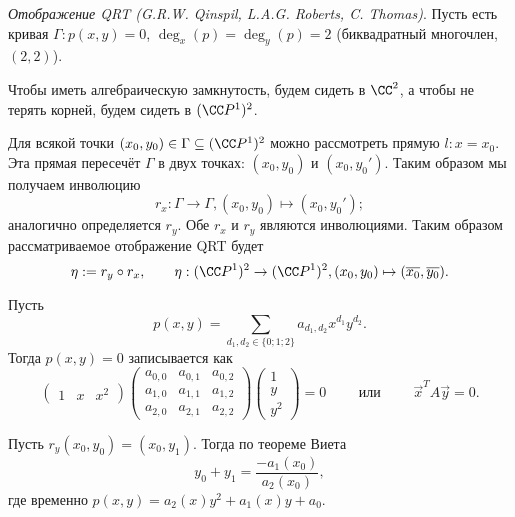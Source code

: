 \documentclass[12pt,a4paper]{article}
\begin{document}
    \begin{definition}
        \emph{Отображение QRT (G.R.W. Qinspil, L.A.G. Roberts, C. Thomas)}. Пусть есть кривая $\Gamma: p(x, y) = 0$, $\deg_x(p) = \deg_y(p) = 2$ (биквадратный многочлен, $(2, 2)$).

        Чтобы иметь алгебраическую замкнутость, будем сидеть в $\CC^2$, а чтобы не терять корней, будем сидеть в $(\CC P^1)^2$.

        Для всякой точки $(x_0, y_0) \in \Gamma \subseteq (\CC P^1)^2$ можно рассмотреть прямую $l: x = x_0$. Эта прямая пересечёт $\Gamma$ в двух точках: $(x_0, y_0)$ и $(x_0, y_0')$. Таким образом мы получаем инволюцию
        \[r_x: \Gamma \to \Gamma, (x_0, y_0) \mapsto (x_0, y_0');\]
        аналогично определяется $r_y$. Обе $r_x$ и $r_y$ являются инволюциями. Таким образом рассматриваемое отображение QRT будет
        \[\eta := r_y \circ r_x, \qquad \eta: (\CC P^1)^2 \to (\CC P^1)^2, (x_0, y_0) \mapsto (\overline{x_0}, \overline{y_0}).\]
    \end{definition}

    \begin{definition}
        Пусть
        \[p(x, y) = \sum_{d_1, d_2 \in \{0; 1; 2\}} a_{d_1, d_2} x^{d_1} y^{d_2}.\]
        Тогда $p(x, y) = 0$ записывается как
        \[
            \begin{pmatrix}
                1& x& x^2
            \end{pmatrix}
            \begin{pmatrix}
                a_{0,0}& a_{0, 1}& a_{0, 2}\\
                a_{1,0}& a_{1, 1}& a_{1, 2}\\
                a_{2,0}& a_{2, 1}& a_{2, 2}
            \end{pmatrix}
            \begin{pmatrix}
                1\\
                y\\
                y^2
            \end{pmatrix}
            = 0
            \qquad \text{ или } \qquad
            \vec{x}^T A \vec{y} = 0.
        \]
    \end{definition}
    
    \begin{remark}
        Пусть $r_y(x_0, y_0) = (x_0, y_1)$. Тогда по теореме Виета
        \[y_0 + y_1 = \frac{-a_1(x_0)}{a_2(x_0)},\]
        где временно $p(x, y) = a_2(x) y^2 + a_1(x) y + a_0$.
    \end{remark}
\end{document}

